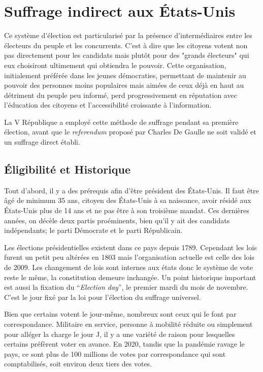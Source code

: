 \documentclass[12pt,a4paper]{report}
\begin{document}
\section{Suffrage indirect aux États-Unis}

Ce système d'élection est particularisé par la présence d'intermédiaires entre les électeurs du peuple et les concurrents. 
C'est à dire que les citoyens votent non pas directement pour les candidats mais plutôt pour des "grands électeurs" qui eux choisiront ultimement qui obtiendra le pouvoir.
Cette organisation, initialement préférée dans les jeunes démocraties, permettant de maintenir au pouvoir des personnes moins populaires mais aimées de ceux déjà en haut au détriment du peuple peu informé, perd progressivement en réputation avec l'éducation des citoyens et l'accessibilité croissante à l'information.
\nocite{wiki:scrutinindir}

La V République a employé cette méthode de suffrage pendant sa première élection, avant que le \textit{referendum} proposé par Charles De Gaulle ne soit validé et un suffrage direct établi. \nocite{polmania:scrutins}

\subsection{Éligibilité et Historique}

Tout d’abord, il y a des prérequis afin d’être président des États-Unis.
Il faut être âgé de minimum 35 ans, citoyen des États-Unis à sa naissance, avoir résidé aux États-Unis plus de 14 ans et ne pas être à son troisième mandat.
Ces dernières années, on décèle deux partis proéminents, bien qu'il y ait des candidats indépendants; le parti Démocrate et le parti Républicain.

Les élections présidentielles existent dans ce pays depuis 1789.
Cependant les lois furent un petit peu altérées en 1803 mais l'organisation actuelle est celle des lois de 2009.
Les changement de lois sont internes aux états donc le système de vote reste le même, la constitution demeure inchangée.
Un point historique important est aussi la fixation du “\textit{Election day}”, le premier mardi du mois de novembre.
C’est le jour fixé par la loi pour l'élection du suffrage universel.

Bien que certains votent le jour-même, nombreux sont ceux qui le font par correspondance.
Militaire en service, personne à mobilité réduite ou simplement pour alléger la charge le jour J, il y a une variété de raison pour lesquelles certains préfèrent voter en avance.
En 2020, tandis que la pandémie ravage le pays, ce sont plus de 100 millions de votes par correspondance qui sont comptabilisés, soit environ deux tiers des votes. \nocite{electproj:electproj}
\end{document}
